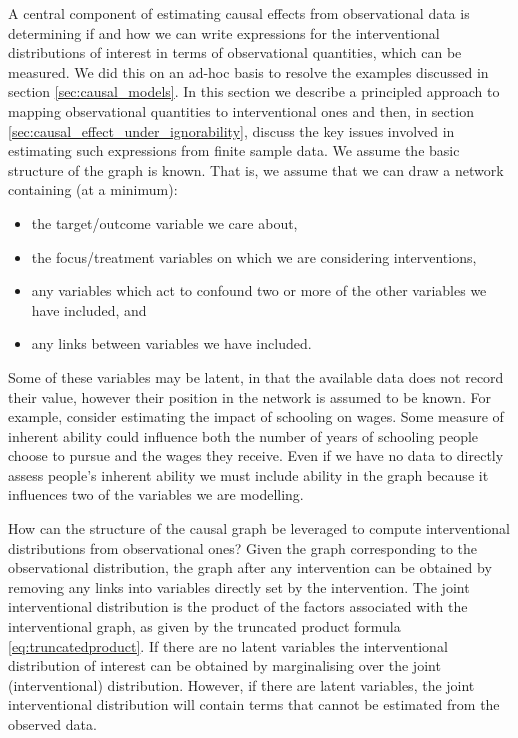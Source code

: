 \documentclass[11pt,a4paper,twoside]{report}
\theoremstyle{plain}
\theoremstyle{definition}
\begin{document}
A central component of estimating causal effects from observational data is determining if and how we can write expressions for the interventional distributions of interest in terms of observational quantities, which can be measured. We did this on an ad-hoc basis to resolve the examples discussed in section \ref{sec:causal_models}. In this section we describe a principled approach to mapping observational quantities to interventional ones and then, in section \ref{sec:causal_effect_under_ignorability}, discuss the key issues involved in estimating such expressions from finite sample data. We assume the basic structure of the graph is known. That is, we assume that we can draw a network containing (at a minimum):

\begin{itemize}
\item the target/outcome variable we care about,
\item the focus/treatment variables on which we are considering interventions,
\item any variables which act to confound two or more of the other variables we have included, and
\item any links between variables we have included. 
\end{itemize}

Some of these variables may be latent, in that the available data does not record their value, however their position in the network is assumed to be known. For example, consider estimating the impact of schooling on wages. Some measure of inherent ability could influence both the number of years of schooling people choose to pursue and the wages they receive. Even if we have no data to directly assess people's inherent ability we must include ability in the graph because it influences two of the variables we are modelling. 

How can the structure of the causal graph be leveraged to compute interventional distributions from observational ones? Given the graph corresponding to the observational distribution, the graph after any intervention can be obtained by removing any links into variables directly set by the intervention. The joint interventional distribution is the product of the factors associated with the interventional graph, as given by the truncated product formula \ref{eq:truncatedproduct}. If there are no latent variables the interventional distribution of interest can be obtained by marginalising over the joint (interventional) distribution. However, if there are latent variables, the joint interventional distribution will contain terms that cannot be estimated from the observed data. 
\end{document}
